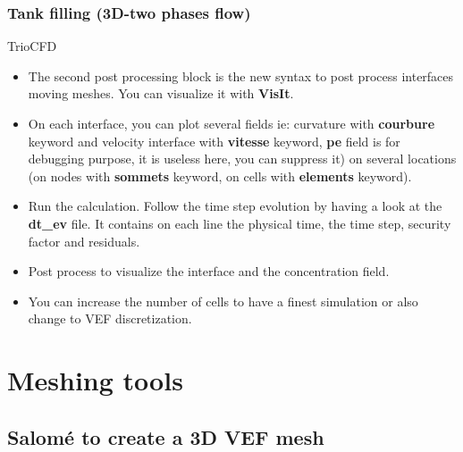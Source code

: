 \documentclass[10pt]{beamer}
\begin{document}
\begin{frame}
\frametitle{Tank filling (3D-two phases flow)}
\begin{block}{TrioCFD}

\begin{itemize}
\item The second post processing block is the new syntax to post process interfaces moving meshes. You can visualize it with \textbf{VisIt}. 

\item On each interface, you can plot several fields ie: curvature with \textbf{courbure} keyword and velocity interface with \textbf{vitesse} keyword, \textbf{pe} field is for debugging purpose, it is useless here, you can suppress it) on several locations (on nodes with \textbf{sommets} keyword, on cells with \textbf{elements} keyword).

\item Run the calculation. Follow the time step evolution by having a look at the \textbf{dt\_ev} file. It contains on each line the physical time, the time step, security factor and residuals.

\item Post process to visualize the interface and the concentration field.

\item You can increase the number of cells to have a finest simulation or also change to VEF discretization.

\end{itemize}

\end{block}
\end{frame}



\section{Meshing tools}
\subsection{Salom\'e to create a 3D VEF mesh}
\begin{frame}
\begin{columns}[c] 
\tableofcontents[sections={1-7},currentsection, currentsubsection]
\tableofcontents[sections={8-13},currentsection, currentsubsection]
\end{columns}
\end{frame}
\end{document}
